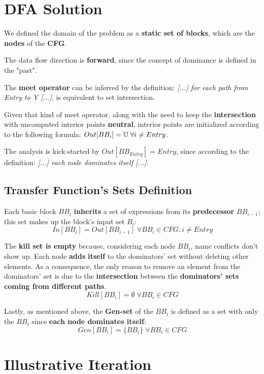 \documentclass[a4paper,12pt,numbers=noenddot]{scrreprt}
\begin{document}
    \section*{DFA Solution}
    
        We defined the domain of the problem as a \textbf{static set of blocks}, which are the \textbf{nodes} of the \textbf{CFG}.
        
        The data flow direction is \textbf{forward}, since the concept of dominance is defined in the "past".
        
        The \textbf{meet operator} can be inferred by the definition: \textit{[...] for each path from Entry to Y [...]}, is equivalent to set intersection.
        
        Given that kind of meet operator, along with the need to keep the \textbf{intersection} with uncomputed interior points \textbf{neutral}, interior points are initialized according to the following formula: 
        $Out[BB_i] = \mathbb{U} \space \; \forall i \neq Entry$.
        
        The analysis is kick-started by $Out[BB_{Entry}] = Entry$, since according to the definition: \textit{[...] each node dominates itself [...]}.

        \subsection*{Transfer Function's Sets Definition}
        
            Each basic block $BB_i$ \textbf{inherits} a set of expressions from its \textbf{predecessor} $BB_{i-1}$; this set makes up the block's input set $B_i$: $$In[BB_i] = Out[BB_{i-1}] \; \forall BB_i \in CFG : i \neq Entry$$
        
            The \textbf{kill set is empty} because, considering each node $BB_i$, name conflicts don't show up. Each node \textbf{adds} \textbf{itself} to the dominators' set without deleting other elements. As a consequence, the only reason to remove an element from the dominators' set is due to the \textbf{intersection} between the \textbf{dominators' sets coming from different paths}.  $$Kill[BB_i] = \emptyset \; \forall BB_i \in CFG$$

            Lastly, as mentioned above, the \textbf{Gen-set} of the $BB_i$ is defined as a set with only the $BB_i$ since \textbf{each node dominates itself}: $$Gen[BB_i] = \{ BB_i \} \; \forall BB_i \in CFG$$ 

    \section*{Illustrative Iteration}
\end{document}
